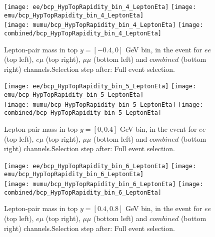 \begin{figure}
  \texttt{[image: ee/bcp\_HypTopRapidity\_bin\_4\_LeptonEta]}
  \texttt{[image: emu/bcp\_HypTopRapidity\_bin\_4\_LeptonEta]}\\
  \texttt{[image: mumu/bcp\_HypTopRapidity\_bin\_4\_LeptonEta]}
  \texttt{[image: combined/bcp\_HypTopRapidity\_bin\_4\_LeptonEta]}
\caption{Lepton-pair mass in top $y = [-0.4,0]$ GeV bin, in the event for $ee$ (top left), $e\mu$ (top right), $\mu\mu$ (bottom left) and $combined$ (bottom right) channels.\newline Selection step after: Full event selection.}
\end{figure}

\clearpage
\newpage


\begin{figure}
  \texttt{[image: ee/bcp\_HypTopRapidity\_bin\_5\_LeptonEta]}
  \texttt{[image: emu/bcp\_HypTopRapidity\_bin\_5\_LeptonEta]}\\
  \texttt{[image: mumu/bcp\_HypTopRapidity\_bin\_5\_LeptonEta]}
  \texttt{[image: combined/bcp\_HypTopRapidity\_bin\_5\_LeptonEta]}
\caption{Lepton-pair mass in top $y = [0,0.4]$ GeV bin, in the event for $ee$ (top left), $e\mu$ (top right), $\mu\mu$ (bottom left) and $combined$ (bottom right) channels.\newline Selection step after: Full event selection.}
\end{figure}

\clearpage
\newpage

\begin{figure}
  \texttt{[image: ee/bcp\_HypTopRapidity\_bin\_6\_LeptonEta]}
  \texttt{[image: emu/bcp\_HypTopRapidity\_bin\_6\_LeptonEta]}\\
  \texttt{[image: mumu/bcp\_HypTopRapidity\_bin\_6\_LeptonEta]}
  \texttt{[image: combined/bcp\_HypTopRapidity\_bin\_6\_LeptonEta]}
\caption{Lepton-pair mass in top $y = [0.4,0.8]$ GeV bin, in the event for $ee$ (top left), $e\mu$ (top right), $\mu\mu$ (bottom left) and $combined$ (bottom right) channels.\newline Selection step after: Full event selection.}
\end{figure}

